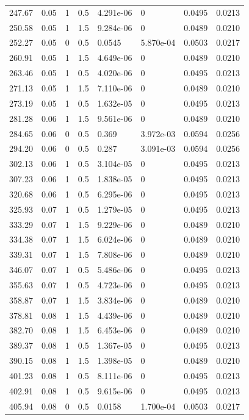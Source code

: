 \documentclass[preview]{standalone}
\begin{document}
{{\begin{tabular}{L{1.2cm}C{1.2cm} C{0.3cm}C{0.5cm} C{1.4cm}C{1.4cm} C{1.4cm}C{1.4cm}}
  247.67  &  0.05  & 1     & 0.5 &  4.291e-06  & 0  & 0.0495 &  0.0213   \\ 
  250.58  &  0.05  & 1     & 1.5 &  9.284e-06  & 0  & 0.0489 &  0.0210   \\ 
  252.27  &  0.05  & 0     & 0.5 &  0.0545  & 5.870e-04  & 0.0503 &  0.0217   \\ 
  260.91  &  0.05  & 1     & 1.5 &  4.649e-06  & 0  & 0.0489 &  0.0210   \\ 
  263.46  &  0.05  & 1     & 0.5 &  4.020e-06  & 0  & 0.0495 &  0.0213   \\ 
  271.13  &  0.05  & 1     & 1.5 &  7.110e-06  & 0  & 0.0489 &  0.0210   \\ 
  273.19  &  0.05  & 1     & 0.5 &  1.632e-05  & 0  & 0.0495 &  0.0213   \\ 
  281.28  &  0.06  & 1     & 1.5 &  9.561e-06  & 0  & 0.0489 &  0.0210   \\ 
  284.65  &  0.06  & 0     & 0.5 &  0.369  & 3.972e-03  & 0.0594 &  0.0256   \\ 
  294.20  &  0.06  & 0     & 0.5 &  0.287  & 3.091e-03  & 0.0594 &  0.0256   \\ 
  302.13  &  0.06  & 1     & 0.5 &  3.104e-05  & 0  & 0.0495 &  0.0213   \\ 
  307.23  &  0.06  & 1     & 0.5 &  1.838e-05  & 0  & 0.0495 &  0.0213   \\ 
  320.68  &  0.06  & 1     & 0.5 &  6.295e-06  & 0  & 0.0495 &  0.0213   \\ 
  325.93  &  0.07  & 1     & 0.5 &  1.279e-05  & 0  & 0.0495 &  0.0213   \\ 
  333.29  &  0.07  & 1     & 1.5 &  9.229e-06  & 0  & 0.0489 &  0.0210   \\ 
  334.38  &  0.07  & 1     & 1.5 &  6.024e-06  & 0  & 0.0489 &  0.0210   \\ 
  339.31  &  0.07  & 1     & 1.5 &  7.808e-06  & 0  & 0.0489 &  0.0210   \\ 
  346.07  &  0.07  & 1     & 0.5 &  5.486e-06  & 0  & 0.0495 &  0.0213   \\ 
  355.63  &  0.07  & 1     & 0.5 &  4.723e-06  & 0  & 0.0495 &  0.0213   \\ 
  358.87  &  0.07  & 1     & 1.5 &  3.834e-06  & 0  & 0.0489 &  0.0210   \\ 
  378.81  &  0.08  & 1     & 1.5 &  4.439e-06  & 0  & 0.0489 &  0.0210   \\ 
  382.70  &  0.08  & 1     & 1.5 &  6.453e-06  & 0  & 0.0489 &  0.0210   \\ 
  389.37  &  0.08  & 1     & 0.5 &  1.367e-05  & 0  & 0.0495 &  0.0213   \\ 
  390.15  &  0.08  & 1     & 1.5 &  1.398e-05  & 0  & 0.0489 &  0.0210   \\ 
  401.23  &  0.08  & 1     & 0.5 &  8.111e-06  & 0  & 0.0495 &  0.0213   \\ 
  402.91  &  0.08  & 1     & 0.5 &  9.615e-06  & 0  & 0.0495 &  0.0213   \\ 
  405.94  &  0.08  & 0     & 0.5 &  0.0158  & 1.700e-04  & 0.0503 &  0.0217   \\ 
\hline 
\end{tabular} 

}}
\end{document}
